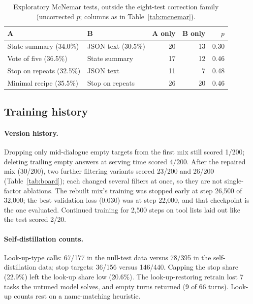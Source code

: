 \documentclass[11pt]{article}
\begin{document}
\begin{table}[H]
\centering
\footnotesize
\caption{Exploratory McNemar tests, outside the eight-test correction family (uncorrected $p$; columns as in Table~\ref{tab:mcnemar}).}
\label{tab:mcnemar-x}
\begin{tabular}{@{}llrrr@{}}
\toprule
A & B & A only & B only & $p$ \\
\midrule
State summary (34.0\%) & JSON text (30.5\%) & 20 & 13 & 0.30 \\
Vote of five (36.5\%) & State summary & 17 & 12 & 0.46 \\
Stop on repeats (32.5\%) & JSON text & 11 & 7 & 0.48 \\
Minimal recipe (35.5\%) & Stop on repeats & 26 & 20 & 0.46 \\
\bottomrule
\end{tabular}
\end{table}

\subsection{Training history}
\label{app:train}

\paragraph{Version history.} Dropping only mid-dialogue empty targets from the first mix still scored 1/200; deleting trailing empty answers at serving time scored 4/200. After the repaired mix (30/200), two further filtering variants scored 23/200 and 26/200 (Table~\ref{tab:board}); each changed several filters at once, so they are not single-factor ablations. The rebuilt mix's training was stopped early at step 26{,}500 of 32{,}000; the best validation loss (0.030) was at step 22{,}000, and that checkpoint is the one evaluated. Continued training for 2{,}500 steps on tool lists laid out like the test scored 2/20.

\paragraph{Self-distillation counts.} Look-up-type calls: 67/177 in the null-test data versus 78/395 in the self-distillation data; stop targets: 36/156 versus 146/440. Capping the stop share (22.9\%) left the look-up share low (20.6\%). The look-up-restoring retrain lost 7 tasks the untuned model solves, and empty turns returned (9 of 66 turns). Look-up counts rest on a name-matching heuristic.
\end{document}
